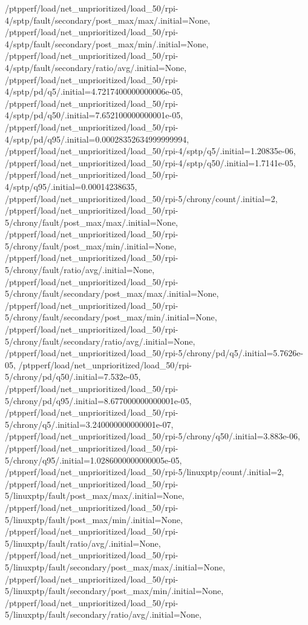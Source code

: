 {    /ptpperf/load/net_unprioritized/load_50/rpi-4/sptp/fault/secondary/post_max/max/.initial=None,
    /ptpperf/load/net_unprioritized/load_50/rpi-4/sptp/fault/secondary/post_max/min/.initial=None,
    /ptpperf/load/net_unprioritized/load_50/rpi-4/sptp/fault/secondary/ratio/avg/.initial=None,
    /ptpperf/load/net_unprioritized/load_50/rpi-4/sptp/pd/q5/.initial=4.7217400000000006e-05,
    /ptpperf/load/net_unprioritized/load_50/rpi-4/sptp/pd/q50/.initial=7.652100000000001e-05,
    /ptpperf/load/net_unprioritized/load_50/rpi-4/sptp/pd/q95/.initial=0.00028352634999999994,
    /ptpperf/load/net_unprioritized/load_50/rpi-4/sptp/q5/.initial=1.20835e-06,
    /ptpperf/load/net_unprioritized/load_50/rpi-4/sptp/q50/.initial=1.7141e-05,
    /ptpperf/load/net_unprioritized/load_50/rpi-4/sptp/q95/.initial=0.00014238635,
    /ptpperf/load/net_unprioritized/load_50/rpi-5/chrony/count/.initial=2,
    /ptpperf/load/net_unprioritized/load_50/rpi-5/chrony/fault/post_max/max/.initial=None,
    /ptpperf/load/net_unprioritized/load_50/rpi-5/chrony/fault/post_max/min/.initial=None,
    /ptpperf/load/net_unprioritized/load_50/rpi-5/chrony/fault/ratio/avg/.initial=None,
    /ptpperf/load/net_unprioritized/load_50/rpi-5/chrony/fault/secondary/post_max/max/.initial=None,
    /ptpperf/load/net_unprioritized/load_50/rpi-5/chrony/fault/secondary/post_max/min/.initial=None,
    /ptpperf/load/net_unprioritized/load_50/rpi-5/chrony/fault/secondary/ratio/avg/.initial=None,
    /ptpperf/load/net_unprioritized/load_50/rpi-5/chrony/pd/q5/.initial=5.7626e-05,
    /ptpperf/load/net_unprioritized/load_50/rpi-5/chrony/pd/q50/.initial=7.532e-05,
    /ptpperf/load/net_unprioritized/load_50/rpi-5/chrony/pd/q95/.initial=8.677000000000001e-05,
    /ptpperf/load/net_unprioritized/load_50/rpi-5/chrony/q5/.initial=3.240000000000001e-07,
    /ptpperf/load/net_unprioritized/load_50/rpi-5/chrony/q50/.initial=3.883e-06,
    /ptpperf/load/net_unprioritized/load_50/rpi-5/chrony/q95/.initial=1.0286000000000005e-05,
    /ptpperf/load/net_unprioritized/load_50/rpi-5/linuxptp/count/.initial=2,
    /ptpperf/load/net_unprioritized/load_50/rpi-5/linuxptp/fault/post_max/max/.initial=None,
    /ptpperf/load/net_unprioritized/load_50/rpi-5/linuxptp/fault/post_max/min/.initial=None,
    /ptpperf/load/net_unprioritized/load_50/rpi-5/linuxptp/fault/ratio/avg/.initial=None,
    /ptpperf/load/net_unprioritized/load_50/rpi-5/linuxptp/fault/secondary/post_max/max/.initial=None,
    /ptpperf/load/net_unprioritized/load_50/rpi-5/linuxptp/fault/secondary/post_max/min/.initial=None,
    /ptpperf/load/net_unprioritized/load_50/rpi-5/linuxptp/fault/secondary/ratio/avg/.initial=None,
}

